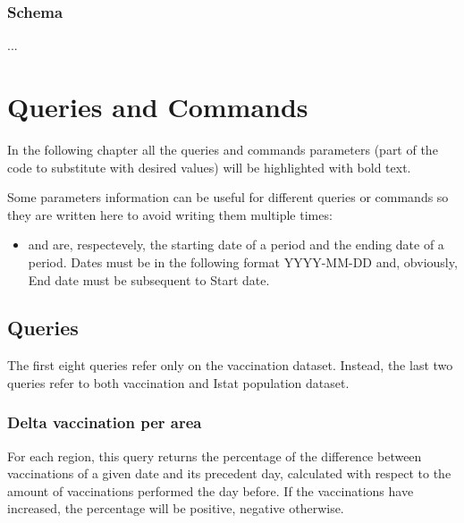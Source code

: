 \documentclass{article}
\begin{document}
\subsubsection{Schema}
...

\newpage
\section{Queries and Commands}
In the following chapter all the queries and commands parameters (part of the code to substitute with desired values) will be highlighted with \textbf{\color{magenta}{magenta}} bold text.

Some parameters information can be useful for different queries or commands so they are written here to avoid writing them multiple times:
\begin{itemize}
    \item \textbf{\color{magenta}{Start date}} and \textbf{\color{magenta}{End date}} are, respectevely, the starting date of a period and the ending date of a period. Dates must be in the following format YYYY-MM-DD and, obviously, End date must be subsequent to Start date.
\end{itemize}
\subsection{Queries}
The first eight queries refer only on the vaccination dataset. Instead, the last two queries refer to both vaccination and Istat population dataset.
\subsubsection{Delta vaccination per area}
For each region, this query returns the percentage of the difference between vaccinations of a given date and its precedent day, calculated with respect to the amount of vaccinations performed the day before.
If the vaccinations have increased, the percentage will be positive, negative otherwise.
\end{document}
